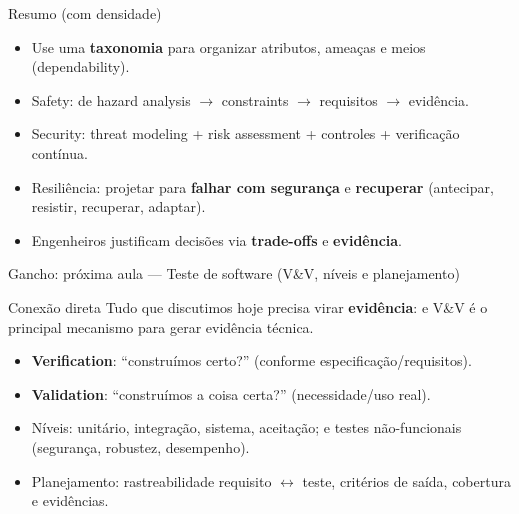 \documentclass{beamer}
\begin{document}
\begin{frame}{Resumo (com densidade)}
\begin{itemize}
  \item Use uma \textbf{taxonomia} para organizar atributos, ameaças e meios (dependability).
  \item Safety: de hazard analysis $\rightarrow$ constraints $\rightarrow$ requisitos $\rightarrow$ evidência.
  \item Security: threat modeling + risk assessment + controles + verificação contínua.
  \item Resiliência: projetar para \textbf{falhar com segurança} e \textbf{recuperar} (antecipar, resistir, recuperar, adaptar).
  \item Engenheiros justificam decisões via \textbf{trade-offs} e \textbf{evidência}.
\end{itemize}
\end{frame}

\begin{frame}{Gancho: próxima aula --- Teste de software (V\&V, níveis e planejamento)}
\begin{block}{Conexão direta}
Tudo que discutimos hoje precisa virar \textbf{evidência}: e V\&V é o principal mecanismo para gerar evidência técnica.
\end{block}

\begin{itemize}
  \item \textbf{Verification}: ``construímos certo?'' (conforme especificação/requisitos).
  \item \textbf{Validation}: ``construímos a coisa certa?'' (necessidade/uso real).
  \item Níveis: unitário, integração, sistema, aceitação; e testes não-funcionais (segurança, robustez, desempenho).
  \item Planejamento: rastreabilidade requisito $\leftrightarrow$ teste, critérios de saída, cobertura e evidências.
\end{itemize}

\end{frame}

\end{document}
